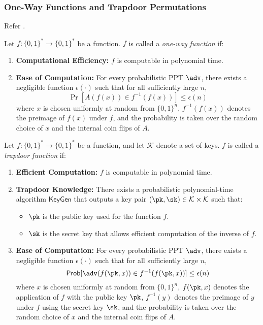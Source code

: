 \documentclass{iacrcc}
\begin{document}
\subsubsection{One-Way Functions and Trapdoor Permutations}

Refer \cite{Levin2003}.

\begin{definition}
Let $f: \{0,1\}^* \to \{0,1\}^*$ be a function. $f$ is called a \textit{one-way function} if:
\begin{enumerate}
\item \textbf{Computational Efficiency:} $f$ is computable in polynomial time.
\item \textbf{Ease of Computation:} For every probabilistic PPT $\adv$, there exists a negligible function $\epsilon(\cdot)$ such that for all sufficiently large $n$,
\[
\Pr[A(f(x)) \in f^{-1}(f(x))] \leq \epsilon(n)
\]
where $x$ is chosen uniformly at random from $\{0,1\}^n$, $f^{-1}(f(x))$ denotes the preimage of $f(x)$ under $f$, and the probability is taken over the random choice of $x$ and the internal coin flips of $A$.
\end{enumerate}
\end{definition}

\begin{definition}
Let $f: \{0,1\}^* \to \{0,1\}^*$ be a function, and let $\mathcal{K}$ denote a set of keys. $f$ is called a \textit{trapdoor function} if:
\begin{enumerate}
\item \textbf{Efficient Computation:} $f$ is computable in polynomial time.
\item \textbf{Trapdoor Knowledge:} There exists a probabilistic polynomial-time algorithm $\mathsf{KeyGen}$ that outputs a key pair $(\pk, \sk) \in \mathcal{K} \times \mathcal{K}$ such that:
\begin{itemize}
\item $\pk$ is the public key used for the function $f$.
\item $\sk$ is the secret key that allows efficient computation of the inverse of $f$.
\end{itemize}
\item \textbf{Ease of Computation:} For every probabilistic PPT $\adv$, there exists a negligible function $\epsilon(\cdot)$ such that for all sufficiently large $n$,
\[
\Pr[\adv(f(\pk, x)) \in f^{-1}(f(\pk, x))] \leq \epsilon(n)
\]
where $x$ is chosen uniformly at random from $\{0,1\}^n$, $f(\pk, x)$ denotes the application of $f$ with the public key $\pk$, $f^{-1}(y)$ denotes the preimage of $y$ under $f$ using the secret key $\sk$, and the probability is taken over the random choice of $x$ and the internal coin flips of $A$.
\end{enumerate}
\end{definition}
\end{document}
